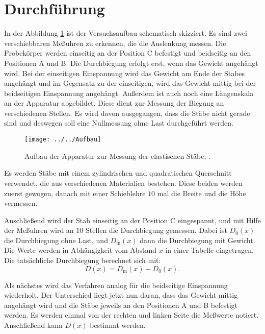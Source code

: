 \section{Durchführung}
\label{sec:Durchführung}
In der Abbildung \ref{fig:aufbau} ist der Versuchsaufbau schematisch skizziert. Es sind zwei verschiebbaren Meßuhren zu erkennen, die die Auslenkung messen. Die Probekörper werden einseitig an der Position C befestigt und beidseitig an den Positionen A und B. Die Durchbiegung erfolgt erst, wenn das Gewicht angehängt wird. Bei der einseitigen Einspannung wird das Gewicht am Ende der Stabes angehängt und im Gegensatz zu der einseitigen, wird das Gewicht mittig bei der beidseitigen Einspannung angehängt.
Außerdem ist auch noch eine Längenskala an der Apparatur abgebildet. Diese dient zur Messung der Biegung an verschiedenen Stellen. 
Es wird davon ausgegangen, dass die Stäbe nicht gerade sind und deswegen soll eine Nullmessung ohne Last durchgeführt werden. 
\begin{figure}[h!]
	\centering
	\texttt{[image: ../../Aufbau]}
	\caption{Aufbau der Apparatur zur Messung der elastischen Stäbe, \cite[6]{anleitung103}.}
	\label{fig:aufbau}
\end{figure}
Es werden Stäbe mit einem zylindrischen und quadratischen Querschnitt verwendet, die aus verschiedenen Materialien bestehen. Diese beiden werden zuerst gewogen, danach mit einer Schieblehre $10$ mal die Breite und die Höhe vermessen. 

Anschließend wird der Stab einseitig an der Position C eingespannt, und mit Hilfe der Meßuhren wird an $10$ Stellen die Durchbiegung gemessen.
Dabei ist $D_{0}(x)$ die Durchbiegung ohne Last, und $D_{\text{m}}(x)$ dann die Durchbiegung mit Gewicht. Die Werte werden in Abhängigkeit vom Abstand $x$ in einer Tabelle eingetragen. Die tatsächliche Durchbiegung berechnet sich mit:
\begin{equation}
\label{eqn:Durchbiegung}
D(x) = D_{\text{m}}(x) - D_{0}(x).
\end{equation}

Als nächstes wird das Verfahren analog für die beidseitige Einspannung wiederholt. Der Unterschied liegt jetzt nun daran, dass das Gewicht mittig angehängt wird und die Stäbe jeweils an den Positionen A  und B befestigt werden. Es werden einmal von der rechten und linken Seite die Meßwerte notiert. Anschließend kann $D(x)$ bestimmt werden. 

